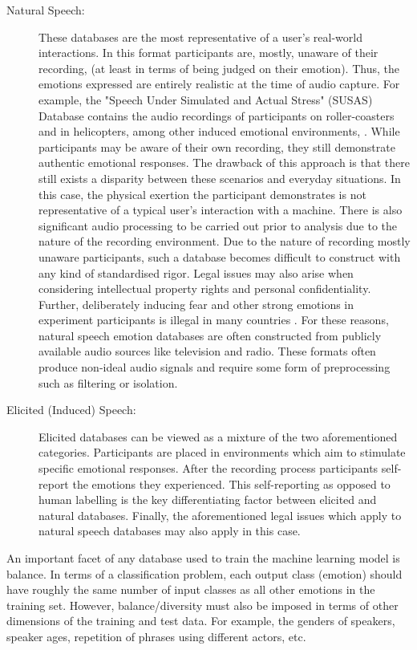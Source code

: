 \begin{description}
\item[Natural Speech:] These databases are the most representative of a user's real-world interactions. In this format participants are, mostly, unaware of their recording, (at least in terms of being judged on their emotion). Thus, the emotions expressed are entirely realistic at the time of audio capture. For example, the "Speech Under Simulated and Actual Stress" (SUSAS) Database contains the audio recordings of participants on roller-coasters and in helicopters, among other induced emotional environments, \cite{SUSAS_1997_DB}. While participants may be aware of their own recording, they still demonstrate authentic emotional responses. The drawback of this approach is that there still exists a disparity between these scenarios and everyday situations. In this case, the physical exertion the participant demonstrates is not representative of a typical user's interaction with a machine. There is also significant audio processing to be carried out prior to analysis due to the nature of the recording environment. Due to the nature of recording mostly unaware participants, such a database becomes difficult to construct with any kind of standardised rigor. Legal issues may also arise when considering intellectual property rights and personal confidentiality. Further, deliberately inducing fear and other strong emotions in experiment participants is illegal in many countries \cite{shaver1987emotion}. For these reasons, natural speech emotion databases are often constructed from publicly available audio sources like television and radio. These formats often produce non-ideal audio signals and require some form of preprocessing such as filtering or isolation.

\item[Elicited (Induced) Speech:]
Elicited databases can be viewed as a mixture of the two aforementioned categories. Participants are placed in environments which aim to stimulate specific emotional responses. After the recording process participants self-report the emotions they experienced. This self-reporting as opposed to human labelling is the key differentiating factor between elicited and natural databases. Finally, the aforementioned legal issues which apply to natural speech databases may also apply in this case. 
\end{description}
An important facet of any database used to train the machine learning model is balance. In terms of a classification problem, each output class (emotion) should have roughly the same number of input classes as all other emotions in the training set. However, balance/diversity must also be imposed in terms of other dimensions of the training and test data. For example, the genders of speakers, speaker ages, repetition of phrases using different actors, etc.

